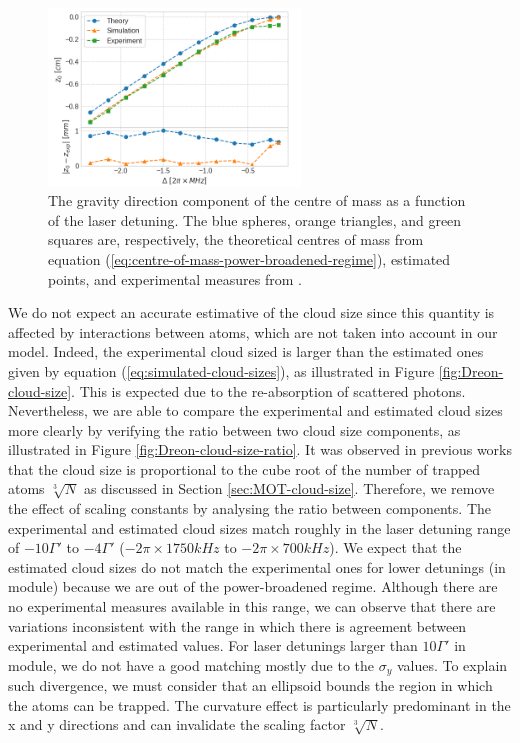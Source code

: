 \begin{figure}[!ht]
    \centering
    \includegraphics[width=0.6\textwidth]{USPSC-img/dy_centre_of_mass.png}
    \vspace{5px}
    \caption{The gravity direction component of the centre of mass as a function of the laser detuning. The blue spheres, orange triangles, and green squares are, respectively, the theoretical centres of mass from equation (\ref{eq:centre-of-mass-power-broadened-regime}), estimated points, and experimental measures from \cite{dreon2017designing}.}
    \label{fig:Dreon-centre-of-mass}
\end{figure}

We do not expect an accurate estimative of the cloud size since this quantity is affected by interactions between atoms, which are not taken into account in our model. Indeed, the experimental cloud sized is larger than the estimated ones given by equation (\ref{eq:simulated-cloud-sizes}), as illustrated in Figure \ref{fig:Dreon-cloud-size}. This is expected due to the re-absorption of scattered photons. Nevertheless, we are able to compare the experimental and estimated cloud sizes more clearly by verifying the ratio between two cloud size components, as illustrated in Figure \ref{fig:Dreon-cloud-size-ratio}. It was observed in previous works \cite{PhysRevA.90.063404} that the cloud size is proportional to the cube root of the number of trapped atoms $ \sqrt[3]{N} $ as discussed in Section \ref{sec:MOT-cloud-size}. Therefore, we remove the effect of scaling constants by analysing the ratio between components. The experimental and estimated cloud sizes match roughly in the laser detuning range of $ -10\Gamma' $ to $ -4\Gamma' $ ($ -2\pi \times 1750 kHz $ to $ -2\pi \times 700 kHz $). We expect that the estimated cloud sizes do not match the experimental ones for lower detunings (in module) because we are out of the power-broadened regime. Although there are no experimental measures available in this range, we can observe that there are variations inconsistent with the range in which there is agreement between experimental and estimated values. For laser detunings larger than $ 10\Gamma' $ in module, we do not have a good matching mostly due to the $ \sigma_y $ values. To explain such divergence, we must consider that an ellipsoid bounds the region in which the atoms can be trapped. The curvature effect is particularly predominant in the x and y directions and can invalidate the scaling factor $ \sqrt[3]{N} $.

